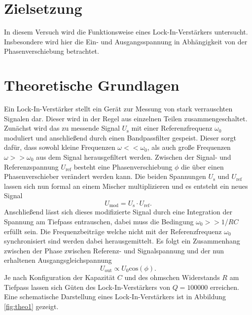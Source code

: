 \section{Zielsetzung}

In diesem Versuch wird die Funktionsweise eines Lock-In-Verstärkers untersucht. Insbesondere wird hier die Ein- und Ausgangsspannung 
in Abhängigkeit von der Phasenverschiebung betrachtet.

\section{Theoretische Grundlagen}

Ein Lock-In-Verstärker stellt ein Gerät zur Messung von stark verrauschten Signalen dar. Dieser wird in der Regel aus einzelnen Teilen zusammengeschaltet. 
\\
Zunächst wird das zu messende Signal $U_\text{s}$ mit einer Referenzfrequenz $\omega_{0}$ moduliert und anschließend durch einen Bandpassfilter gespeist. Dieser sorgt dafür, dass sowohl kleine Frequenzen $\omega << \omega_{0}$, als auch große Frequenzen $\omega >> \omega_{0}$ aus dem Signal 
herausgefiltert werden. Zwischen der Signal- und Referenzspannung $U_\text{ref}$ besteht eine Phasenverschiebung $\phi$ die über einen Phasenverschieber verändert werden kann. Die beiden Spannungen $U_\text{s}$ und $U_\text{ref}$ lassen sich nun formal an einem Mischer multiplizieren und es entsteht ein
neues Signal 
\begin{equation*}
U_{\text{mod}} = U_\text{s} \cdot U_{\text{ref}}. 
\end{equation*}
Anschließend lässt sich dieses modifizierte Signal durch eine Integration der Spannung am Tiefpass entrauschen, dabei muss die Bedingung $\omega_0 >> 1$/$RC$ erfüllt sein. Die Frequenzbeiträge welche nicht mit der Referenzfrequenz $\omega_0$ synchronisiert sind werden dabei herausgemittelt.
Es folgt ein Zusammenhang zwischen der Phase zwischen Referenz- und Signalspannung und der
nun erhaltenen Ausgangsgleichspannung
\begin{equation}
    U_{\text{out}} \propto U_{0} \text{cos}(\phi).
\end{equation}
Je nach Konfiguration der Kapazität $C$ und des ohmschen Widerstands $R$ am Tiefpass lassen sich Güten des Lock-In-Verstärkers von $Q = 100000$ erreichen.
\\
Eine schematische Darstellung eines Lock-In-Verstärkers ist in Abbildung \ref{fig:theo1} gezeigt.

